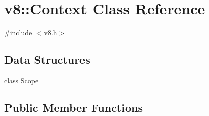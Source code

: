 \hypertarget{classv8_1_1Context}{}\section{v8\+:\+:Context Class Reference}
\label{classv8_1_1Context}


{\ttfamily \#include $<$v8.\+h$>$}

\subsection*{Data Structures}
\begin{DoxyCompactItemize}
\item 
class \hyperlink{classv8_1_1Context_1_1Scope}{Scope}
\end{DoxyCompactItemize}
\subsection*{Public Member Functions}
